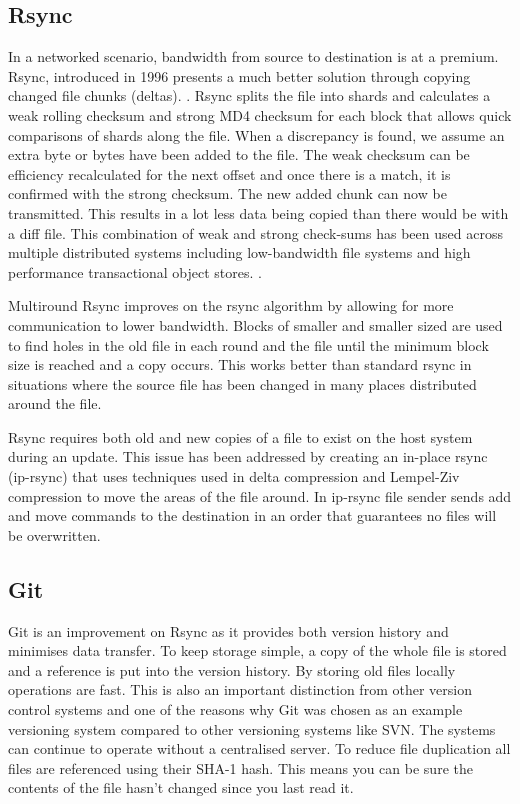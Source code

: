 \documentclass[a4paper, 11pt, twocolumn, twoside]{report}
\begin{document}
\subsection{Rsync}
In a networked scenario, bandwidth from source to destination is at a premium. Rsync, introduced in 1996 presents a much better solution through copying changed file chunks (deltas). \citep{tridgell1996rsync}. Rsync splits the file into shards and calculates a weak rolling checksum and strong MD4 checksum for each block that allows quick comparisons of shards along the file. When a discrepancy is found, we assume an extra byte or bytes have been added to the file. The weak checksum can be efficiency recalculated for the next offset and once there is a match, it is confirmed with the strong checksum. The new added chunk can now be transmitted. This results in a lot less data being copied than there would be with a diff file. \citep{tridgell1996rsync} This combination of weak and strong check-sums has been used across multiple distributed systems including low-bandwidth file systems \citep{muthitacharoen2001low} and high performance transactional object stores. \citep{stephen2000platypus}.

Multiround Rsync improves on the rsync algorithm by allowing for more communication to lower bandwidth. Blocks of smaller and smaller sized are used to find holes in the old file in each round and the file until the minimum block size is reached and a copy occurs. \citep{multiroundrsync} This works better than standard rsync in situations where the source file has been changed in many places distributed around the file.

Rsync requires both old and new copies of a file to exist on the host system during an update. This issue has been addressed by creating an in-place rsync (ip-rsync) that uses techniques used in delta compression and Lempel-Ziv compression to move the areas of the file around. In ip-rsync file sender sends add and move commands to the destination in an order that guarantees no files will be overwritten. \citep{rasch2003place}


\subsection{Git}
Git is an improvement on Rsync as it provides both version history and minimises data transfer. To keep storage simple, a copy of the whole file is stored and a reference is put into the version history. By storing old files locally operations are fast. This is also an important distinction from other version control systems and one of the reasons why Git was chosen as an example versioning system compared to other versioning systems like SVN. The systems can continue to operate without a centralised server. To reduce file duplication all files are referenced using their SHA-1 hash. This means you can be sure the contents of the file hasn’t changed since you last read it. \citep{torvalds2010git}
\end{document}
